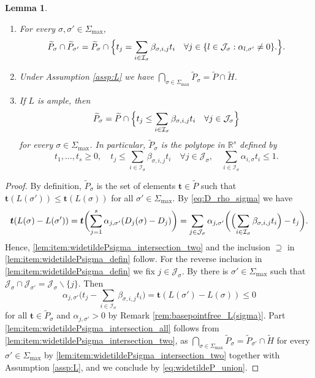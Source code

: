 \documentclass[JEP,XML,SOM,Unicode,published]{cedram}
\newenvironment{enumeratei}
{\bgroup\def\theenumi{\roman{enumi}}\def\theenumii{\arabic{enumii}}\begin{enumerate}}
{\end{enumerate}\egroup}
\newcommand{\bft}{\boldsymbol{t}}
\newcommand\RR{\mathbb{R}}
\newcommand{\ii}[1]{\mathcal{J}_{#1}}
\newcommand{\ic}[1]{\mathcal{I}_{#1}}
\newtheorem{lemma}[theorem]{Lemma}
\theoremstyle{definition}
\numberwithin{theorem}{section}
\begin{document}
\pagebreak[2]
\skpt
\begin{lemma}
\label{lem:widetildePsigma}
\begin{enumeratei}
\item
\label{lem:item:widetildePsigma_intersection_two}
For every $\sigma, \sigma'\in\Sigma_{\max}$,
\[
\widetilde P_\sigma \cap \widetilde P_{\sigma'} =
\widetilde P_\sigma \cap
\Bigl \{
t_{j}
= \sum_{i\in\ic{\sigma}} \beta_{\sigma, i, j}t_i
\quad \forall j\in \{l\in \ii{\sigma} : \alpha_{l, \sigma'}\neq0\}.
\Bigr \}.
\]
\item
\label{lem:item:widetildePsigma_intersection_all}
Under Assumption \ref{assp:L} we have
$\bigcap_{\sigma\in\Sigma_{\max}} \widetilde P_{\sigma} =\widetilde P \cap \widetilde H$.
\item
\label{lem:item:widetildePsigma_defin}
If $L$ is ample, then
\[
\widetilde P_\sigma
= \widetilde P \cap
\Bigl \{
t_{j}
\leq \sum_{i\in\ic{\sigma}} \beta_{\sigma, i, j}t_i
\quad \forall j\in\ii{\sigma}
\Bigr \}
\]
for every $\sigma\in\Sigma_{\max}$.
In particular, $\widetilde P_\sigma$
is the polytope in $\RR^{s}$ defined by
\[
t_1,\dots,t_s \geq0, \quad
t_{j}
\leq \sum_{i\in\ic{\sigma}} \beta_{\sigma, i,j}t_i
\quad \forall j\in\ii{\sigma}, \quad
\sum_{i\in\ic{\sigma}} \alpha_{i,\sigma}t_i \leq 1.
\]
\end{enumeratei}
\end{lemma}
\begin{proof}
By definition, $\widetilde P_{\sigma}$ is the set of elements $\bft\in \widetilde P$
such that $\bft(L(\sigma'))\leq \bft(L(\sigma))$
for all $\sigma'\in\Sigma_{\max}$. By \eqref{eq:D_rho_sigma} we have
\begin{equation*}
\bft (L(\sigma) - L(\sigma'))
= \bft \biggl(\sum_{j=1}^s \alpha_{j,\sigma'} (D_j(\sigma) - D_j) \biggr)
= \sum_{j\in \ii{\sigma}} \alpha_{j,\sigma'}
\biggl (\Bigl(
\sum_{i\in\ic{\sigma}}\beta_{\sigma,i,j} t_i
\Bigr) - {t_j} \biggr).
\end{equation*}
Hence, \eqref{lem:item:widetildePsigma_intersection_two} and
the inclusion $\supseteq$ in \eqref{lem:item:widetildePsigma_defin} follow.
For the reverse inclusion in \eqref{lem:item:widetildePsigma_defin} we fix $j\in\ii{\sigma}$.
By \cite[Lem.\,8.9]{MR1679841}
there is
$\sigma'\in\Sigma_{\max}$ such that
$\ii{\sigma}\cap\ii{\sigma'}=\ii{\sigma}\smallsetminus\{j\}$.
Then
\[
\alpha_{j,\sigma'}
\biggl(
{t_j}
-\sum_{i\in\ic{\sigma}}\beta_{\sigma,i,j} t_i
\biggr) = \bft (L(\sigma') - L(\sigma)) \leq 0
\]
for all $\bft\in\widetilde P_\sigma$ and $\alpha_{j,\sigma'}>0$
by Remark \ref{rem:basepointfree_L(sigma)}.
Part \eqref{lem:item:widetildePsigma_intersection_all} follows
from \eqref{lem:item:widetildePsigma_intersection_two},
as $\bigcap_{\sigma\in\Sigma_{\max}} \widetilde P_{\sigma} =\widetilde P_{\sigma'} \cap \widetilde H$
for every $\sigma'\in\Sigma_{\max}$ by \eqref{lem:item:widetildePsigma_intersection_two}
together with Assumption \ref{assp:L}, and we conclude by \eqref{eq:widetildeP_union}.
\end{proof}
\end{document}
